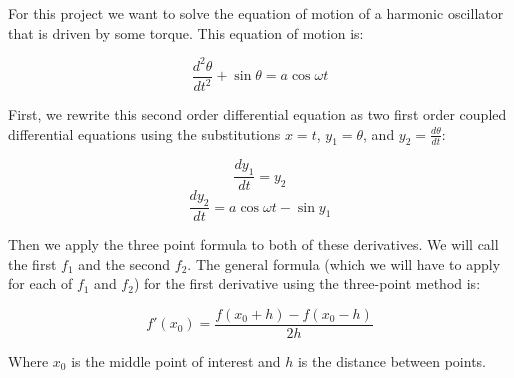 \documentclass[11pt]{amsart}
\begin{document}
\vspace{3 mm}

For this project we want to solve the equation of motion of a harmonic oscillator that is driven by some torque.  This equation of motion is:

\begin{equation}
\frac{d^{2} \theta}{d t^{2}} + \sin{\theta} = a \cos{\omega t}
\end{equation}
\vspace{2 mm}

First, we rewrite this second order differential equation as two first order coupled differential equations using the substitutions $x=t$, $y_1 = \theta$, and $y_2 = \frac{d \theta}{d t}$:

\begin{equation}
\frac{d y_1}{dt} = y_2
\end{equation}
\begin{equation}
\frac{d y_2}{dt} = a \cos{\omega t}- \sin{y_1}
\end{equation}

\vspace{2 mm}

Then we apply the three point formula to both of these derivatives.  We will call the first $f_1$ and the second $f_2$.  The general formula (which we will have to apply for each of $f_1$ and $f_2$) for the first derivative using the three-point method is:
\newline

\begin{equation}
f \prime (x_0) = \frac{f(x_0 + h) - f(x_0 - h)}{2h}
\end{equation}

Where $x_0$ is the middle point of interest and $h$ is the distance between points.
\end{document}
